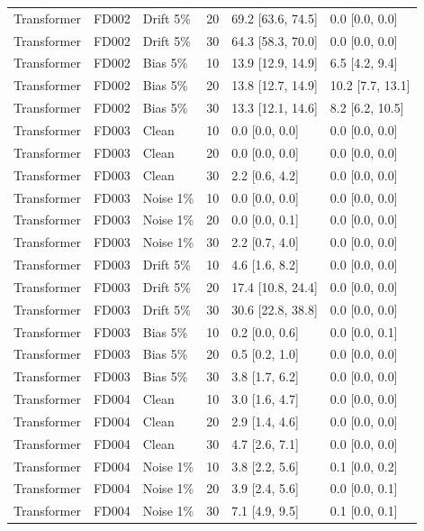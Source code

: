 \documentclass[10pt,a4paper]{article}
\begin{document}
\begin{center}
\begin{longtable}{lllcll}
Transformer & FD002 & Drift 5\% & 20 & 69.2 [63.6, 74.5] & 0.0 [0.0, 0.0]  \\
Transformer & FD002 & Drift 5\% & 30 & 64.3 [58.3, 70.0] & 0.0 [0.0, 0.0]  \\
Transformer & FD002 & Bias 5\% & 10 & 13.9 [12.9, 14.9] & 6.5 [4.2, 9.4]  \\
Transformer & FD002 & Bias 5\% & 20 & 13.8 [12.7, 14.9] & 10.2 [7.7, 13.1]  \\
Transformer & FD002 & Bias 5\% & 30 & 13.3 [12.1, 14.6] & 8.2 [6.2, 10.5]  \\
Transformer & FD003 & Clean & 10 & 0.0 [0.0, 0.0] & 0.0 [0.0, 0.0]  \\
Transformer & FD003 & Clean & 20 & 0.0 [0.0, 0.0] & 0.0 [0.0, 0.0]  \\
Transformer & FD003 & Clean & 30 & 2.2 [0.6, 4.2] & 0.0 [0.0, 0.0]  \\
Transformer & FD003 & Noise 1\% & 10 & 0.0 [0.0, 0.0] & 0.0 [0.0, 0.0]  \\
Transformer & FD003 & Noise 1\% & 20 & 0.0 [0.0, 0.1] & 0.0 [0.0, 0.0]  \\
Transformer & FD003 & Noise 1\% & 30 & 2.2 [0.7, 4.0] & 0.0 [0.0, 0.0]  \\
Transformer & FD003 & Drift 5\% & 10 & 4.6 [1.6, 8.2] & 0.0 [0.0, 0.0]  \\
Transformer & FD003 & Drift 5\% & 20 & 17.4 [10.8, 24.4] & 0.0 [0.0, 0.0]  \\
Transformer & FD003 & Drift 5\% & 30 & 30.6 [22.8, 38.8] & 0.0 [0.0, 0.0]  \\
Transformer & FD003 & Bias 5\% & 10 & 0.2 [0.0, 0.6] & 0.0 [0.0, 0.1]  \\
Transformer & FD003 & Bias 5\% & 20 & 0.5 [0.2, 1.0] & 0.0 [0.0, 0.0]  \\
Transformer & FD003 & Bias 5\% & 30 & 3.8 [1.7, 6.2] & 0.0 [0.0, 0.0]  \\
Transformer & FD004 & Clean & 10 & 3.0 [1.6, 4.7] & 0.0 [0.0, 0.0]  \\
Transformer & FD004 & Clean & 20 & 2.9 [1.4, 4.6] & 0.0 [0.0, 0.0]  \\
Transformer & FD004 & Clean & 30 & 4.7 [2.6, 7.1] & 0.0 [0.0, 0.0]  \\
Transformer & FD004 & Noise 1\% & 10 & 3.8 [2.2, 5.6] & 0.1 [0.0, 0.2]  \\
Transformer & FD004 & Noise 1\% & 20 & 3.9 [2.4, 5.6] & 0.0 [0.0, 0.1]  \\
Transformer & FD004 & Noise 1\% & 30 & 7.1 [4.9, 9.5] & 0.1 [0.0, 0.1]  \\

\end{longtable}
\end{center}
\end{document}
